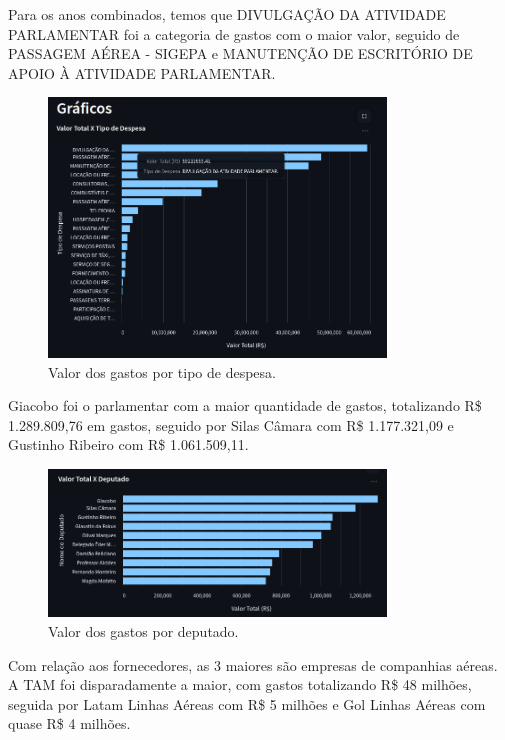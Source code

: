 \documentclass[12pt, a4paper]{article}
\begin{document}
Para os anos combinados, temos que DIVULGAÇÃO DA ATIVIDADE PARLAMENTAR foi a categoria de gastos com o maior valor, seguido de PASSAGEM AÉREA - SIGEPA e MANUTENÇÃO DE ESCRITÓRIO DE APOIO À ATIVIDADE PARLAMENTAR.

\begin{figure}[!htbp]
	\centering
	\includegraphics[width=0.8\textwidth]{assets/2_plot2.png}
	\caption{Valor dos gastos por tipo de despesa.}
	\label{fig:criacao_postgresql}
\end{figure}

Giacobo foi o parlamentar com a maior quantidade de gastos, totalizando R\$ 1.289.809,76 em gastos, seguido por Silas Câmara com R\$ 1.177.321,09 e Gustinho Ribeiro com R\$ 1.061.509,11.

\begin{figure}[!htbp]
	\centering
	\includegraphics[width=0.8\textwidth]{assets/2_plot3.png}
	\caption{Valor dos gastos por deputado.}
	\label{fig:criacao_postgresql}
\end{figure}

Com relação aos fornecedores, as 3 maiores são empresas de companhias aéreas. A TAM foi disparadamente a maior, com gastos totalizando R\$ 48 milhões, seguida por Latam Linhas Aéreas com R\$ 5 milhões e Gol Linhas Aéreas com quase R\$ 4 milhões.
\end{document}
